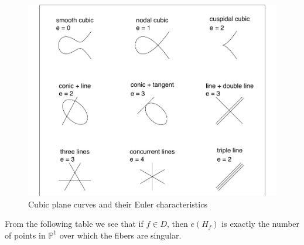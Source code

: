 \documentclass[12pt]{article}
\theoremstyle{plain}
\theoremstyle{definition}
\newcommand{\IP}{\mathbb{P}}
\newcommand{\<}{\langle}
\renewcommand{\>}{\rangle}
\begin{document}
\begin{figure}[h!]
  \label{figure}
  \centering
      \includegraphics[width=1.0\textwidth]{planecubics}
  \caption{Cubic plane curves and their Euler characteristics \cite{Pic}}
\end{figure}
From the following table we see that if $f \in D$, then $e(H_f)$ is exactly the number of points in $\IP^1$ over which the fibers are singular. 
\end{document}
